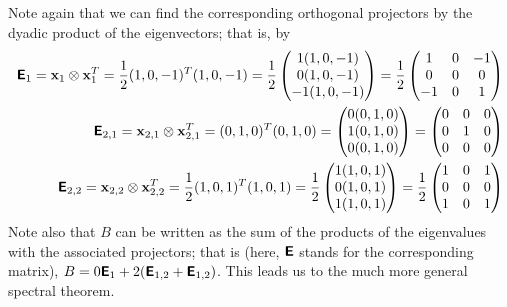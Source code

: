 {Note again that we can find the corresponding orthogonal projectors by the dyadic product
of the eigenvectors; that is,  by
\begin{equation}
\begin{split}
\textsf{\textbf{E}}_1 =
{\bf x}_1 \otimes {\bf x}_1^T =
\frac{1}{2} (1,0,-1)^T(1,0,-1) =
\frac{1}{2}
\begin{pmatrix}
1(1,0,-1)\\
0(1,0,-1)\\
-1(1,0,-1)
\end{pmatrix} =
\frac{1}{2}
\begin{pmatrix}
1&0&-1\\
0&0&0\\
-1&0&1
\end{pmatrix}
\\
\textsf{\textbf{E}}_{2,1} =
{\bf x}_{2,1} \otimes {\bf x}_{2,1}^T =
(0,1,0)^T(0,1,0) =
\begin{pmatrix}
0(0,1,0)\\
1(0,1,0)\\
0(0,1,0)
\end{pmatrix} =
\begin{pmatrix}
0&0&0\\
0&1&0\\
0&0&0
\end{pmatrix}
\\
\textsf{\textbf{E}}_{2,2} =
{\bf x}_{2,2} \otimes {\bf x}_{2,2}^T =
\frac{1}{2} (1,0,1)^T(1,0,1) =
\frac{1}{2}
\begin{pmatrix}
1(1,0,1)\\
0(1,0,1)\\
1(1,0,1)
\end{pmatrix} =
\frac{1}{2}
\begin{pmatrix}
1&0&1\\
0&0&0\\
1&0&1
\end{pmatrix}
\end{split}
\end{equation}
Note also that $B$ can be written as the sum of the products of the
eigenvalues with the associated projectors; that is (here, $\textsf{\textbf{E}}$
stands for the corresponding matrix),
$B= 0  \textsf{\textbf{E}}_1 + 2 (\textsf{\textbf{E}}_{1,2} + \textsf{\textbf{E}}_{1,2} )$.
This leads us to the much more general spectral theorem.

}
